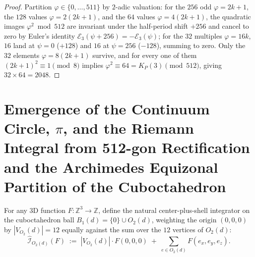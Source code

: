 \documentclass[11pt,a4paper]{article}
\theoremstyle{plain}
\theoremstyle{definition}
\begin{document}
\begin{proof}
Partition $\varphi\in\{0,\dots,511\}$ by $2$-adic valuation: for the $256$ odd $\varphi=2k+1$, the $128$ values $\varphi=2(2k+1)$, and the $64$ values $\varphi=4(2k+1)$, the quadratic images $\varphi^2\bmod 512$ are invariant under the half-period shift $+256$ and cancel to zero by Euler's identity $\mathcal{E}_3(\psi+256)=-\mathcal{E}_3(\psi)$; for the $32$ multiples $\varphi=16k$, $16$ land at $\psi=0$ ($+128$) and $16$ at $\psi=256$ ($-128$), summing to zero. Only the $32$ elements $\varphi=8(2k+1)$ survive, and for every one of them $(2k+1)^2\equiv 1\pmod 8$ implies $\varphi^2\equiv 64 = K_P(3)\pmod{512}$, giving $32\times 64 = 2048$.
\end{proof}

\section{Emergence of the Continuum Circle, \texorpdfstring{$\pi$}{pi}, and the Riemann Integral from 512-gon Rectification and the Archimedes Equizonal Partition of the Cuboctahedron}
\label{sec:continuum-emergence}

For any 3D function $F\colon\mathbb{Z}^3\to\mathbb{Z}$, define the natural center-plus-shell integrator on the cuboctahedron ball $B_1(d)=\{0\}\cup O_2(d)$, weighting the origin $(0,0,0)$ by $|V_{O_2}(d)|=12$ equally against the sum over the $12$ vertices of $O_2(d)$:
\begin{equation}
  \label{eq:cuboct-3d-integrator}
  \widehat{\mathcal{I}}_{O_2(d)}(F) \;:=\; |V_{O_2}(d)|\cdot F(0,0,0) \;+\; \sum_{e\in O_2(d)} F(e_x,e_y,e_z).
\end{equation}
\end{document}
